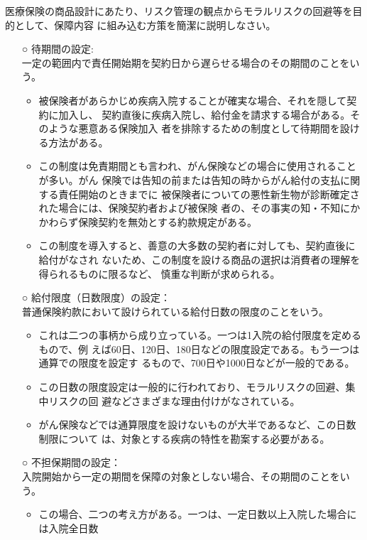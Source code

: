 \documentclass[report,gutter=10mm,fore-edge=10mm,uplatex,dvipdfmx]{jlreq}
\begin{document}
 医療保険の商品設計にあたり、リスク管理の観点からモラルリスクの回避等を目的として、保障内容
 に組み込む方策を簡潔に説明しなさい。
\begin{itemize}
 \item [○] 待期間の設定:\\
 一定の範囲内で責任開始期を契約日から遅らせる場合のその期間のことをいう。
\begin{itemize}
 \item 被保険者があらかじめ疾病入院することが確実な場合、それを隠して契約に加入し、
 契約直後に疾病入院し、給付金を請求する場合がある。そのような悪意ある保険加入
 者を排除するための制度として待期間を設ける方法がある。
 \item この制度は免責期間とも言われ、がん保険などの場合に使用されることが多い。がん
 保険では告知の前または告知の時からがん給付の支払に関する責任開始のときまでに
 被保険者についての悪性新生物が診断確定された場合には、保険契約者および被保険
 者の、その事実の知・不知にかかわらず保険契約を無効とする約款規定がある。
 \item この制度を導入すると、善意の大多数の契約者に対しても、契約直後に給付がなされ
 ないため、この制度を設ける商品の選択は消費者の理解を得られるものに限るなど、
 慎重な判断が求められる。
\end{itemize}
 \item [○] 給付限度（日数限度）の設定：\\
 普通保険約款において設けられている給付日数の限度のことをいう。
\begin{itemize}
 \item これは二つの事柄から成り立っている。一つは1入院の給付限度を定めるもので、例
 えば60日、120日、180日などの限度設定である。もう一つは通算での限度を設定す
 るもので、700日や1000日などが一般的である。
 \item この日数の限度設定は一般的に行われており、モラルリスクの回避、集中リスクの回
 避などさまざまな理由付けがなされている。
 \item がん保険などでは通算限度を設けないものが大半であるなど、この日数制限について
 は、対象とする疾病の特性を勘案する必要がある。
\end{itemize}
 \item [○] 不担保期間の設定：\\
 入院開始から一定の期間を保障の対象としない場合、その期間のことをいう。
\begin{itemize}
 \item この場合、二つの考え方がある。一つは、一定日数以上入院した場合には入院全日数

\end{itemize}
\end{itemize}
\end{document}
